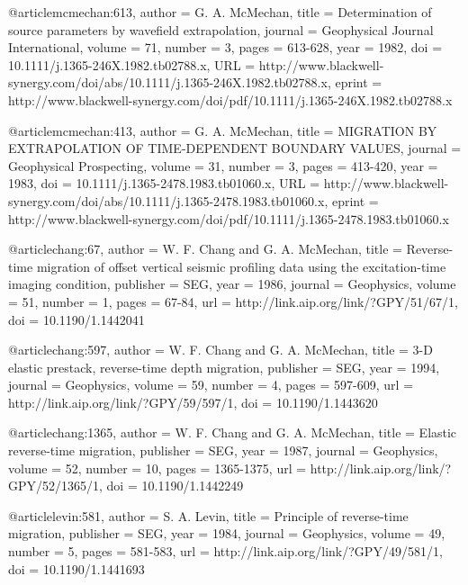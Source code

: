 {@article{mcmechan:613,
  author =	 {G. A. McMechan},
  title =	 {Determination of source parameters by wavefield
                  extrapolation},
  journal =	 {Geophysical Journal International},
  volume =	 71,
  number =	 3,
  pages =	 {613-628},
  year =	 1982,
  doi =		 {10.1111/j.1365-246X.1982.tb02788.x},
  URL =
                  {http://www.blackwell-synergy.com/doi/abs/10.1111/j.1365-246X.1982.tb02788.x},
  eprint =
                  {http://www.blackwell-synergy.com/doi/pdf/10.1111/j.1365-246X.1982.tb02788.x}
}

@article{mcmechan:413,
  author =	 {G. A. McMechan},
  title =	 {MIGRATION BY EXTRAPOLATION OF TIME-DEPENDENT
                  BOUNDARY VALUES},
  journal =	 {Geophysical Prospecting},
  volume =	 31,
  number =	 3,
  pages =	 {413-420},
  year =	 1983,
  doi =		 {10.1111/j.1365-2478.1983.tb01060.x},
  URL =
                  {http://www.blackwell-synergy.com/doi/abs/10.1111/j.1365-2478.1983.tb01060.x},
  eprint =
                  {http://www.blackwell-synergy.com/doi/pdf/10.1111/j.1365-2478.1983.tb01060.x}
}

@article{chang:67,
  author =	 {W. F. Chang and G. A. McMechan},
  title =	 {Reverse-time migration of offset vertical seismic
                  profiling data using the excitation-time imaging
                  condition},
  publisher =	 {SEG},
  year =	 1986,
  journal =	 {Geophysics},
  volume =	 51,
  number =	 1,
  pages =	 {67-84},
  url =		 {http://link.aip.org/link/?GPY/51/67/1},
  doi =		 {10.1190/1.1442041}
}

@article{chang:597,
  author =	 {W. F. Chang and G. A. McMechan},
  title =	 {3-{D} elastic prestack, reverse-time depth
                  migration},
  publisher =	 {SEG},
  year =	 1994,
  journal =	 {Geophysics},
  volume =	 59,
  number =	 4,
  pages =	 {597-609},
  url =		 {http://link.aip.org/link/?GPY/59/597/1},
  doi =		 {10.1190/1.1443620}
}

@article{chang:1365,
  author =	 {W. F. Chang and G. A. McMechan},
  title =	 {Elastic reverse-time migration},
  publisher =	 {SEG},
  year =	 1987,
  journal =	 {Geophysics},
  volume =	 52,
  number =	 10,
  pages =	 {1365-1375},
  url =		 {http://link.aip.org/link/?GPY/52/1365/1},
  doi =		 {10.1190/1.1442249}
}

@article{levin:581,
  author =	 {S. A. Levin},
  title =	 {Principle of reverse-time migration},
  publisher =	 {SEG},
  year =	 1984,
  journal =	 {Geophysics},
  volume =	 49,
  number =	 5,
  pages =	 {581-583},
  url =		 {http://link.aip.org/link/?GPY/49/581/1},
  doi =		 {10.1190/1.1441693}
}

}
